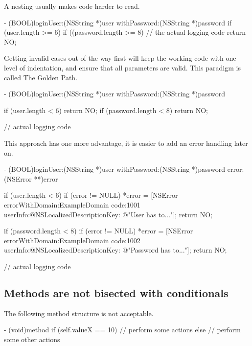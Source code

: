 \documentclass[10pt]{extarticle}
\begin{document}
A nesting usually makes code harder to read.

\begin{codelisting}
- (BOOL)loginUser:(NSString *)user withPassword:(NSString *)password
{
    if (user.length >= 6) {
        if ((password.length >= 8) {
            // the actual logging code
        }
    }
    return NO;
}
\end{codelisting}

Getting invalid cases out of the way first will keep the working code with one level of indentation, and ensure that all parameters are valid. This paradigm is called The Golden Path.

\begin{codelisting}
- (BOOL)loginUser:(NSString *)user withPassword:(NSString *)password
{
    if (user.length < 6) return NO;
    if (password.length < 8) return NO;
    
    // actual logging code
}
\end{codelisting}

This approach has one more advantage, it is easier to add an error handling later on.

\begin{codelisting}
- (BOOL)loginUser:(NSString *)user withPassword:(NSString *)password error:(NSError **)error
{
    if (user.length < 6) {
        if (error != NULL)
            *error = [NSError errorWithDomain:ExampleDomain
                                         code:1001
                                     userInfo:@{NSLocalizedDescriptionKey: @"User has to..."}];
        return NO;
    }
    
    if (password.length < 8) {
        if (error != NULL)
            *error = [NSError errorWithDomain:ExampleDomain
                                         code:1002
                                     userInfo:@{NSLocalizedDescriptionKey: @"Password has to..."}];
        return NO;
    }
    
    // actual logging code
}
\end{codelisting}

\subsection{Methods are not bisected with conditionals}

The following method structure is not acceptable.

\begin{codelisting}
- (void)method
{
    if (self.valueX == 10) {
        // perform some actions
    }
    else {
        // perform some other actions
    }
}
\end{codelisting}
\end{document}
